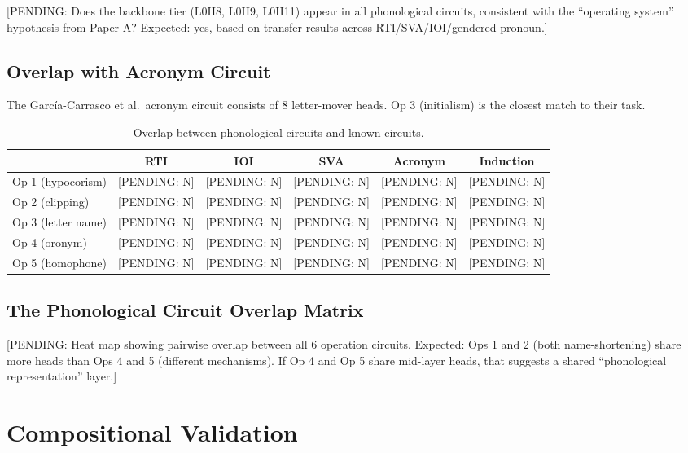 \documentclass{article}
\newcommand{\PENDING}[1]{{\color{blue}[PENDING: #1]}}
\begin{document}
\PENDING{Does the backbone tier (L0H8, L0H9, L0H11) appear in all phonological
circuits, consistent with the ``operating system'' hypothesis from Paper A?
Expected: yes, based on transfer results across RTI/SVA/IOI/gendered pronoun.}

\subsection{Overlap with Acronym Circuit}

The Garc\'ia-Carrasco et al.\ acronym circuit consists of 8 letter-mover heads.
Op 3 (initialism) is the closest match to their task.

\begin{table}[h!]
\centering
\caption{Overlap between phonological circuits and known circuits.}
\label{tab:overlap}
\small
\begin{tabular}{lccccc}
\toprule
& \textbf{RTI} & \textbf{IOI} & \textbf{SVA} & \textbf{Acronym} & \textbf{Induction} \\
\midrule
Op 1 (hypocorism) & \PENDING{N} & \PENDING{N} & \PENDING{N} & \PENDING{N} & \PENDING{N} \\
Op 2 (clipping)   & \PENDING{N} & \PENDING{N} & \PENDING{N} & \PENDING{N} & \PENDING{N} \\
Op 3 (letter name)& \PENDING{N} & \PENDING{N} & \PENDING{N} & \PENDING{N} & \PENDING{N} \\
Op 4 (oronym)     & \PENDING{N} & \PENDING{N} & \PENDING{N} & \PENDING{N} & \PENDING{N} \\
Op 5 (homophone)  & \PENDING{N} & \PENDING{N} & \PENDING{N} & \PENDING{N} & \PENDING{N} \\
\bottomrule
\end{tabular}
\end{table}

\subsection{The Phonological Circuit Overlap Matrix}

\PENDING{Heat map showing pairwise overlap between all 6 operation circuits.
Expected: Ops 1 and 2 (both name-shortening) share more heads than Ops 4 and 5
(different mechanisms). If Op 4 and Op 5 share mid-layer heads, that suggests
a shared ``phonological representation'' layer.}

\section{Compositional Validation}
\end{document}
